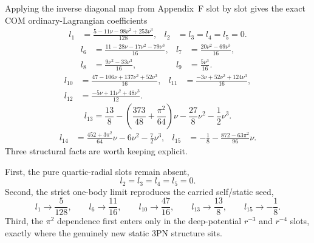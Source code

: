 \documentclass[11pt]{article}
\begin{document}
Applying the inverse diagonal map from Appendix~F slot by slot gives the exact
COM ordinary-Lagrangian coefficients
\begin{equation}
\begin{aligned}
 l_1&=\frac{5-11\nu-98\nu^2+253\nu^3}{128},
 & l_2&=l_3=l_4=l_5=0.
\end{aligned}
\label{eq:app-gr-com-target-l-1-5}
\end{equation}
\begin{equation}
\begin{aligned}
 l_6&=\frac{11-28\nu-17\nu^2-79\nu^3}{16},
 & l_7&=\frac{20\nu^2-69\nu^3}{16},
\\[0.5ex]
 l_8&=\frac{9\nu^2-33\nu^3}{16},
 & l_9&=\frac{5\nu^3}{16}.
\end{aligned}
\label{eq:app-gr-com-target-l-6-9}
\end{equation}
\begin{equation}
\begin{aligned}
 l_{10}&=\frac{47-106\nu+137\nu^2+52\nu^3}{16},
 & l_{11}&=\frac{-3\nu+52\nu^2+124\nu^3}{16},
\\[0.5ex]
 l_{12}&=\frac{-5\nu+11\nu^2+48\nu^3}{12}.
\end{aligned}
\label{eq:app-gr-com-target-l-10-12}
\end{equation}
\begin{equation}
 l_{13}=\frac{13}{8}-\left(\frac{373}{48}+\frac{\pi^2}{64}\right)\nu
 -\frac{27}{8}\nu^2-\frac12\nu^3.
\label{eq:app-gr-com-target-l-13}
\end{equation}
\begin{equation}
\begin{aligned}
 l_{14}&=\frac{452+3\pi^2}{64}\nu-6\nu^2-\frac72\nu^3,
 & l_{15}&=-\frac18-\frac{872-63\pi^2}{96}\nu.
\end{aligned}
\label{eq:app-gr-com-target-l-14-15}
\end{equation}
Three structural facts are worth keeping explicit.

First, the pure quartic-radial slots remain absent,
\begin{equation}
 l_2=l_3=l_4=l_5=0.
\label{eq:app-gr-com-target-no-quartic-radial}
\end{equation}
Second, the strict one-body limit reproduces the carried self/static seed,
\begin{equation}
 l_1\to \frac{5}{128},
\qquad
 l_6\to \frac{11}{16},
\qquad
 l_{10}\to \frac{47}{16},
\qquad
 l_{13}\to \frac{13}{8},
\qquad
 l_{15}\to -\frac18.
\label{eq:app-gr-com-target-test-mass-l}
\end{equation}
Third, the $\pi^2$ dependence first enters only in the deep-potential
$r^{-3}$ and $r^{-4}$ slots, exactly where the genuinely new static $3$PN
structure sits.
\end{document}
